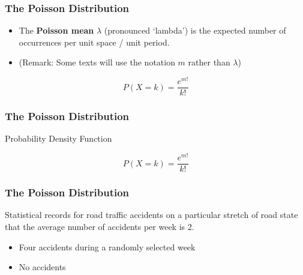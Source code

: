 \documentclass{beamer}
\begin{document}
\begin{frame}
\frametitle{The Poisson Distribution}
{\Large
\begin{itemize}
\item The \textbf{Poisson mean} $\lambda$ (pronounced `lambda') is the expected number of occurrences per unit space / unit period.
\item (Remark:  Some texts will use the notation $m$ rather than $\lambda$)
\end{itemize}


\[P(X=k) = \frac{e^{m!}}{k!}\]
}
\end{frame}

\begin{frame}
\frametitle{The Poisson Distribution}
{\LARGE
Probability Density Function

\[P(X=k) = \frac{e^{m!}}{k!}\]
}
\end{frame}

\begin{frame}
\frametitle{The Poisson Distribution}
Statistical records for road traffic accidents on a particular stretch of road state that the average number of accidents per week is 2.

\begin{itemize}
\item Four accidents during a randomly selected week
\item No accidents
\end{itemize}
\end{frame}
\end{document}
